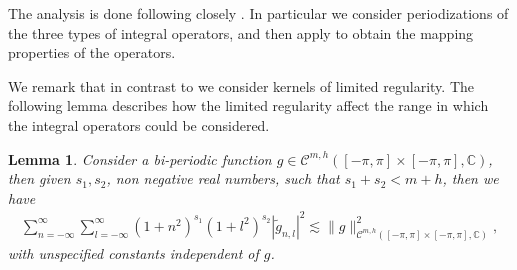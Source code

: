 \documentclass{article}
\newtheorem{lemma}[theorem]{Lemma}
\newcommand{\IC}{{\mathbb C}}
\newcommand{\cmspaceh}[4]{\mathcal{C}^{#1,#2} \left( #3, #4 \right)}
\begin{document}
The analysis is done following closely \cite[Chapters 6 and 11]{saranen2013periodic}. In particular we consider periodizations of the three types of integral operators, and then apply \cite[Theorem 6.1.3]{saranen2013periodic} to obtain the mapping properties of the operators. 

We remark that in contrast to \cite[Chapter 6]{saranen2013periodic}  we consider kernels of limited regularity. The following lemma describes how the limited regularity affect the range in which the integral operators could be considered.  

\begin{lemma}
\label{lemma:cmdecay2}
Consider a bi-periodic function $g \in \cmspaceh{m}{h}{[-\pi,\pi]\times[-\pi,\pi]}{\IC}$, then given $s_1, s_2$, non negative real numbers, such that $s_1+s_2 < m+h$, then we have 
\begin{align*}
\sum_{n=-\infty}^{\infty}\sum_{l=-\infty}^{\infty}
(1+n^2)^{s_1} (1+l^2)^{s_2} |\widetilde{g}_{n,l}|^2 \lesssim \|g\|^2_{\cmspaceh{m}{h}{[-\pi,\pi]\times[-\pi,\pi]}{\IC}},
\end{align*}
with unspecified constants independent of $g$. 
\end{lemma}
\end{document}
